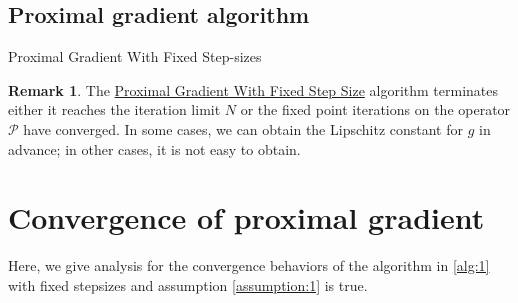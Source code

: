 \documentclass[]{article}
\theoremstyle{definition}
\newtheorem{remark}{Remark}[subsection]
{
    \newtheorem{assumption}{Assumption}
}
\begin{document}
    \subsection{Proximal gradient algorithm}
        \begin{algorithm}[H]
            \begin{algorithmic}[1]
                \ENDIF
            \ENDFOR
            \end{algorithmic}
            \caption{Proximal Gradient With Fixed Step-sizes}
            \label{alg:1}
        \end{algorithm}
        \begin{remark}
            The \hyperref[alg:1]{Proximal Gradient With Fixed Step Size} algorithm terminates either it reaches the iteration limit $N$ or the fixed point iterations on the operator $\mathcal P$ have converged. In some cases, we can obtain the Lipschitz constant for $g$ in advance; in other cases, it is not easy to obtain. 
        \end{remark}

\section{Convergence of proximal gradient}\label{sec:pg_convergence}
    Here, we give analysis for the convergence behaviors of the algorithm in \hyperref[alg:1]{\ref*{alg:1}} with fixed stepsizes and assumption \hyperref[assumption:1]{\ref*{assumption:1}} is true. 
\end{document}
